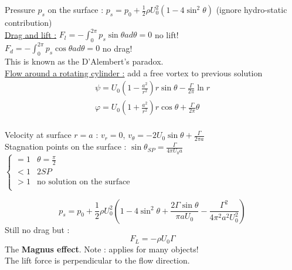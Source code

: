 \documentclass[../main.tex]{subfiles}
\begin{document}
Pressure $p_s$ on the surface : $p_s = p_0 + \frac{1}{2}\rho U_0^2(1-4\sin^2\theta)$ (ignore hydro-static contribution)\\

\underline{Drag and lift :} $F_l = -\int_0^{2\pi} p_s \sin{\theta} a d\theta = 0$ no lift!\\
$F_d = -\int_0^{2\pi} p_s \cos{\theta} a d\theta=0$ no drag! \\
This is known as the D'Alembert's paradox.\\

\quad \underline{Flow around a rotating cylinder :} add a free vortex to previous solution\\

\begin{equation}
    \begin{gathered}
        \psi = U_0(1-\frac{a^2}{r^2})r\sin{\theta} - \frac{\Gamma}{2\pi} \ln{r}\\
        \varphi = U_0(1+\frac{a^2}{r^2})r\cos{\theta} + \frac{\Gamma}{2\pi}\theta\\
    \end{gathered}
\end{equation}

Velocity at surface $r=a$ : $v_r = 0$, $v_\theta = -2U_0 \sin{\theta} + \frac{\Gamma}{2\pi a}$\\

Stagnation points on the surface : $\sin{\theta_{SP}} = \frac{\Gamma}{4\pi U_0 a}$ $ \begin{cases}
    =1 & \theta = \frac{\pi}{2}\\
    <1 & 2 SP\\
    >1 & \text{no solution on the surface}\\
\end{cases}$

\begin{equation}
    p_s = p_0 + \frac{1}{2}\rho U_0^2 (1-4\sin^2\theta + \frac{2\Gamma \sin{\theta}}{\pi a U_0} - \frac{\Gamma^2}{4\pi^2 a^2 U_0^2})
\end{equation}
Still no drag but : \\
\begin{equation}
    F_L = -\rho U_0 \Gamma
\end{equation}
The \textbf{Magnus effect}. \color{gray}Note : applies for many objects!\color{black}\\
The lift force is perpendicular to the flow direction.\\
\end{document}
